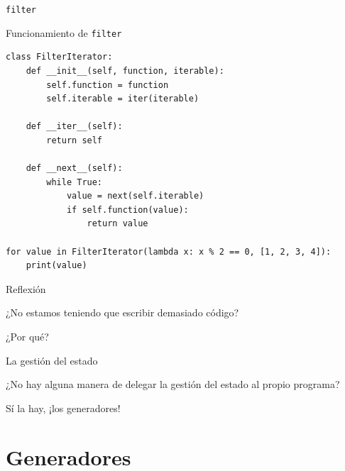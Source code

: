 \documentclass[11pt]{beamer}
\begin{document}
\begin{frame}[fragile]{\texttt{filter}}
\begin{block}{Funcionamiento de \texttt{filter}}
\begin{verbatim}
class FilterIterator:
    def __init__(self, function, iterable):
        self.function = function
        self.iterable = iter(iterable)

    def __iter__(self):
        return self

    def __next__(self):
        while True:
            value = next(self.iterable)
            if self.function(value):
                return value

for value in FilterIterator(lambda x: x % 2 == 0, [1, 2, 3, 4]):
    print(value)
\end{verbatim}
\end{block}  
\end{frame}

\begin{frame}{Reflexión}
    \begin{center}
        ¿No estamos teniendo que escribir demasiado código?
    \end{center}
    \begin{center}
        ¿Por qué?
    \end{center}
\end{frame}

\begin{frame}{La gestión del estado}
    \begin{center}
        ¿No hay alguna manera de delegar la gestión del estado al propio programa?
    \end{center}
    \begin{center}
        Sí la hay, ¡los generadores!
    \end{center}
\end{frame}

\section{Generadores}
\end{document}
